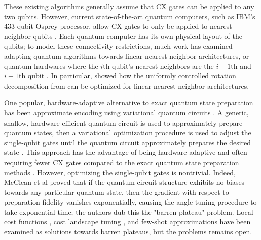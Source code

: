 \documentclass{article}
\begin{document}
These existing algorithms generally assume that CX gates can be applied to any
two qubits. However, current state-of-the-art quantum computers, such as IBM's
433-qubit Osprey processor, allow CX gates to only be applied to
nearest-neighbor qubits \cite{bravyi2022future}. Each quantum computer has its own physical layout of
the qubits; to model these connectivity restrictions, much work has examined
adapting quantum algorithms towards linear nearest neighbor architectures, or
quantum hardwares where the $i$th qubit's nearest neighbors are the $i-1$th and
$i+1$th qubit \cite{1629135, bergholm2005quantum, 4782917, Saeedi_Wille_Drechsler_2010}. In particular, \cite{bergholm2005quantum} showed how the uniformly
controlled rotation decomposition from \cite{1629135} can be optimized for 
linear nearest neighbor architectures. 

One popular, hardware-adaptive alternative to exact quantum state preparation 
has been approximate encoding using variational quantum circuits \cite{PhysRevResearch.4.023136}. A generic, 
shallow, hardware-efficient quantum circuit is used to approximately prepare 
quantum states, then a variational optimization procedure is used to adjust the
single-qubit gates until the quantum 
circuit approximately prepares the desired state \cite{PhysRevA.98.032309}. This approach has the 
advantage of being hardware adaptive and often requiring fewer CX gates compared to the 
exact quantum state preparation methods \cite{Cerezo_Sone_Volkoff_Cincio_Coles_2021}. However, optimizing the single-qubit gates is 
nontrivial. Indeed, McClean et al \cite{McClean_Boixo_Smelyanskiy_Babbush_Neven_2018} proved that if the 
quantum circuit structure exhibits no biases towards any particular quantum 
state, then the gradient with respect to preparation fidelity vanishes 
exponentially, causing the angle-tuning procedure to take exponential time; the
authors dub this the "barren plateau" problem. Local cost functions \cite{Cerezo_Sone_Volkoff_Cincio_Coles_2021}, cost
landscape tuning \cite{rivera2021avoiding}, and few-shot approximations \cite{PhysRevResearch.4.023136} have been examined as solutions
towards barren plateaus, but the problems remains open.
\end{document}
